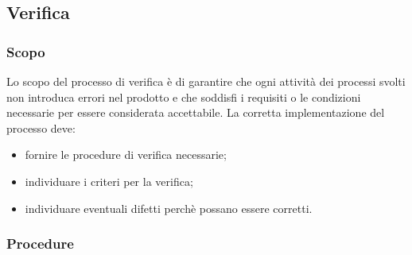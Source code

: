     \subsection{Verifica}\label{sec:verifica}
        \subsubsection{Scopo}
        Lo scopo del processo di verifica è di garantire che ogni attività dei processi svolti non introduca errori nel prodotto e che soddisfi i requisiti o le condizioni necessarie per essere considerata accettabile. La corretta implementazione del processo deve:
        \begin{itemize}
            \item fornire le procedure di verifica necessarie;
            \item individuare i criteri per la verifica;
            \item individuare eventuali difetti perchè possano essere corretti.
        \end{itemize}

        \subsubsection{Procedure}
